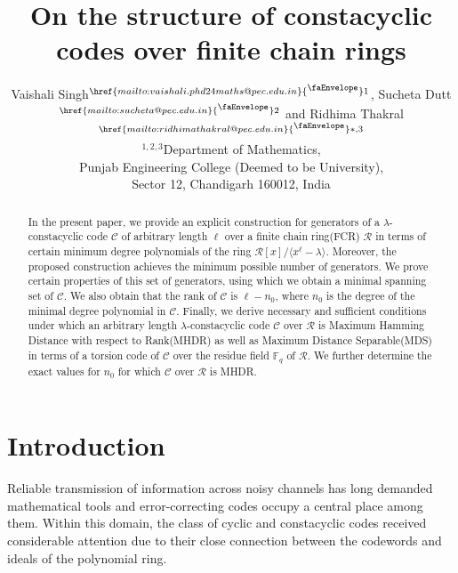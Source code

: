 \documentclass[12pt,a4paper]{article}
\newcommand{\mailicon}[1]{%
  \href{mailto:#1}{\textsuperscript{\faEnvelope}}%
}
\begin{document}
\title{On the structure of constacyclic codes over finite chain rings}
\author{
Vaishali Singh$^{\mailicon{vaishali.phd24maths@pec.edu.in}1}$,
Sucheta Dutt$^{\mailicon{sucheta@pec.edu.in}2}$ and
Ridhima Thakral$^{\mailicon{ridhimathakral@pec.edu.in}*,3}$\\[6pt]
$^{1,2,3}$Department of Mathematics,\\
Punjab Engineering College (Deemed to be University),\\
Sector 12, Chandigarh 160012, India
}
\date{}
\maketitle

\begin{abstract}
In the present paper, we provide an explicit construction for generators of a $\lambda$-constacyclic code $\mathcal{C}$ of arbitrary length $\ell$ over a finite chain ring(FCR) $\mathcal{R}$ in terms of certain minimum degree polynomials of the ring $\mathcal{R}[x]/ \langle x^{\ell}-\lambda \rangle$. Moreover, the proposed construction achieves the minimum possible number of generators. We prove certain properties of this set of generators, using which we obtain a minimal spanning set of $\mathcal{C}$. We also obtain that the rank of $\mathcal{C}$ is $\ell-n_0$, where $n_0$ is the degree of the minimal degree polynomial in $\mathcal{C}$. Finally, we derive necessary and sufficient conditions under which an arbitrary length $\lambda$-constacyclic code $\mathcal{C}$ over $\mathcal{R}$ is Maximum Hamming Distance with respect to Rank(MHDR) as well as Maximum Distance Separable(MDS) in terms of a torsion code of $\mathcal{C}$ over the residue field $\mathbb{F}_q$ of $\mathcal{R}$. We further determine the exact values for $n_0$ for which $\mathcal{C}$ over $\mathcal{R}$ is MHDR.
\end{abstract}

\section{Introduction}
Reliable transmission of information across noisy channels has long demanded mathematical tools and error-correcting codes occupy a central place among them.  Within this domain, the class of cyclic and constacyclic codes received considerable attention due to their close connection between the codewords and ideals of the polynomial ring.
\end{document}
